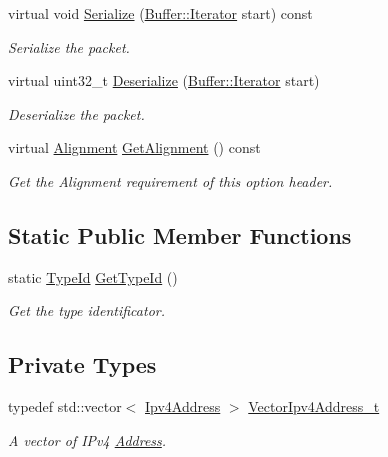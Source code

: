 \begin{DoxyCompactItemize}
virtual void \hyperlink{classns3_1_1dsr_1_1DsrOptionSRHeader_ab21a0cc427b0606f671b9a8d880ca759}{Serialize} (\hyperlink{classns3_1_1Buffer_1_1Iterator}{Buffer\+::\+Iterator} start) const 
\begin{DoxyCompactList}\small\item\em Serialize the packet. \end{DoxyCompactList}\item 
virtual uint32\+\_\+t \hyperlink{classns3_1_1dsr_1_1DsrOptionSRHeader_a83a9b996c0be40f74b61f8b56f82330e}{Deserialize} (\hyperlink{classns3_1_1Buffer_1_1Iterator}{Buffer\+::\+Iterator} start)
\begin{DoxyCompactList}\small\item\em Deserialize the packet. \end{DoxyCompactList}\item 
virtual \hyperlink{structns3_1_1dsr_1_1DsrOptionHeader_1_1Alignment}{Alignment} \hyperlink{classns3_1_1dsr_1_1DsrOptionSRHeader_a2da79b8edd105c45751c95a440c26072}{Get\+Alignment} () const 
\begin{DoxyCompactList}\small\item\em Get the Alignment requirement of this option header. \end{DoxyCompactList}\end{DoxyCompactItemize}
\subsection*{Static Public Member Functions}
\begin{DoxyCompactItemize}
\item 
static \hyperlink{classns3_1_1TypeId}{Type\+Id} \hyperlink{classns3_1_1dsr_1_1DsrOptionSRHeader_a68bdae0c028a9e7d65aac26a4980a218}{Get\+Type\+Id} ()
\begin{DoxyCompactList}\small\item\em Get the type identificator. \end{DoxyCompactList}\end{DoxyCompactItemize}
\subsection*{Private Types}
\begin{DoxyCompactItemize}
\item 
typedef std\+::vector$<$ \hyperlink{classns3_1_1Ipv4Address}{Ipv4\+Address} $>$ \hyperlink{classns3_1_1dsr_1_1DsrOptionSRHeader_aba5fdbda48fa7a2b2d4107bf820ee493}{Vector\+Ipv4\+Address\+\_\+t}
\begin{DoxyCompactList}\small\item\em A vector of I\+Pv4 \hyperlink{classns3_1_1Address}{Address}. \end{DoxyCompactList}\end{DoxyCompactItemize}
